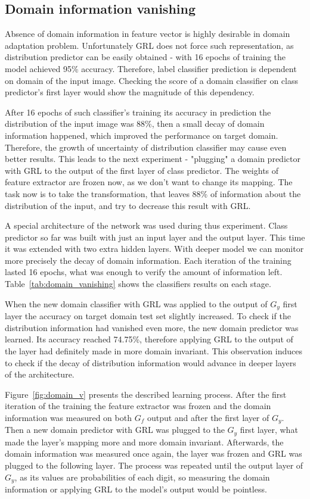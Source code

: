 \documentclass{article}
\begin{document}
\subsection{Domain information vanishing}
Absence of domain information in feature vector is highly desirable in domain adaptation problem. Unfortunately GRL does not force such representation, as distribution predictor can be easily obtained - with 16 epochs of training the model achieved 95\% accuracy. Therefore, label classifier prediction is dependent on domain of the input image. Checking the score of a domain classifier on class predictor's first layer would show the magnitude of this dependency. 
\par
After 16 epochs of such classifier's training its accuracy in prediction the distribution of the input image was 88\%, then a small decay of domain information happened, which improved the performance on target domain. Therefore, the growth of uncertainty of distribution classifier may cause even better results. This leads to the next experiment - "plugging" a domain predictor with GRL to the output of the first layer of class predictor. The weights of feature extractor are frozen now, as we don't want to change its mapping. The task now is to take the transformation, that leaves 88\% of information about the distribution of the input, and try to decrease this result with GRL.
\par
A special architecture of the network was used during thus experiment. Class predictor so far was built with just an input layer and the output layer. This time it was extended with two extra hidden layers. With deeper model we can monitor more precisely the decay of domain information. Each iteration of the training lasted 16 epochs, what was enough to verify the amount of information left. Table~\ref{tab:domain_vanishing} shows the classifiers results on each stage. 
\par
When the new domain classifier with GRL was applied to the output of $G_{y}$ first layer the accuracy on target domain test set slightly increased. To check if the distribution information had vanished even more, the new domain predictor was learned. Its accuracy reached 74.75\%, therefore applying GRL to the output of the layer had definitely made in more domain invariant. This observation induces to check if the decay of distribution information would advance in deeper layers of the architecture.
\par
Figure~\ref{fig:domain_v} presents the described learning process. After the first iteration of the training the feature extractor was frozen and the domain information was measured on both $G_{f}$ output and after the first layer of $G_{y}$. Then a new domain predictor with GRL was plugged to the $G_{y}$ first layer, what made the layer's mapping more and more domain invariant. Afterwards, the domain information was measured once again, the layer was frozen and GRL was plugged to the following layer. The process was repeated until the output layer of $G_{y}$, as its values are probabilities of each digit, so measuring the domain information or applying GRL to the model's output would be pointless. 
\end{document}
